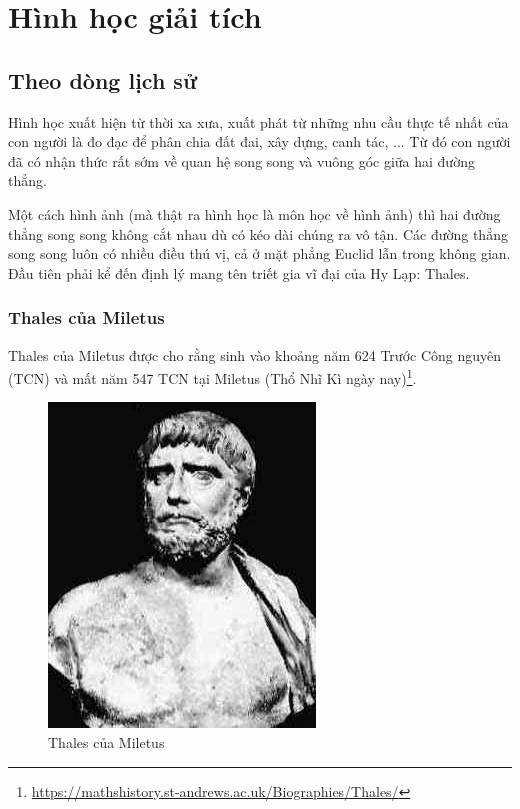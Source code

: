 \chapter{Hình học giải tích}

\section{Theo dòng lịch sử}

Hình học xuất hiện từ thời xa xưa, xuất phát từ những nhu cầu thực tế nhất của con người là đo đạc để phân chia đất đai, xây dựng, canh tác, ... Từ đó con người đã có nhận thức rất sớm về quan hệ song song và vuông góc giữa hai đường thẳng.

Một cách hình ảnh (mà thật ra hình học là môn học về hình ảnh) thì hai đường thẳng song song không cắt nhau dù có kéo dài chúng ra vô tận. Các đường thẳng song song luôn có nhiều điều thú vị, cả ở mặt phẳng Euclid lẫn trong không gian. Đầu tiên phải kể đến định lý mang tên triết gia vĩ đại của Hy Lạp: Thales.

\subsection*{Thales của Miletus}

Thales của Miletus được cho rằng sinh vào khoảng năm 624 Trước Công nguyên (TCN) và mất năm 547 TCN tại Miletus (Thổ Nhĩ Kì ngày nay)\footnote{\url{https://mathshistory.st-andrews.ac.uk/Biographies/Thales/}}.

\begin{figure}[ht]
	\centering
	\includegraphics[scale=0.5]{analytic_geometry/Thales.jpeg}
	\caption{Thales của Miletus}
\end{figure}

